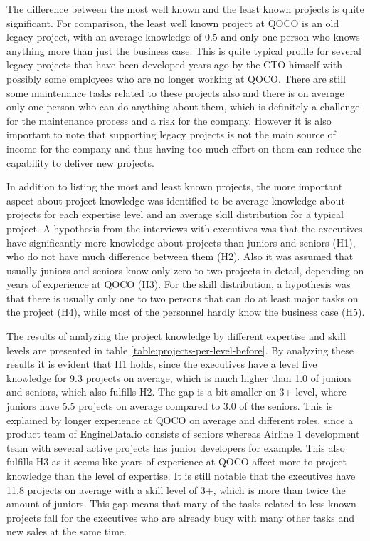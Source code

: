 The difference between the most well known and the least known projects is quite significant. For comparison, the least well known project at QOCO is an old legacy project, with an average
knowledge of 0.5 and only one person who knows anything more than just the business case. This is quite typical profile for several legacy projects that have been developed
years ago by the CTO himself with possibly some employees who are no longer working at QOCO. There are still some maintenance tasks related to these projects also and there is on average
only one person who can do anything about them, which is definitely a challenge for the maintenance process and a risk for the company. However it is also important to note that
supporting legacy projects is not the main source of income for the company and thus having too much effort on them can reduce the capability to deliver new projects.

In addition to listing the most and least known projects, the more important aspect about project knowledge was identified to be average knowledge about projects for each
expertise level and an average skill distribution for a typical project. A hypothesis from the interviews with executives was that the executives have significantly more knowledge
about projects than juniors and seniors (H1), who do not have much difference between them (H2). Also it was assumed that usually juniors and seniors know only zero to two projects in detail,
depending on years of experience at QOCO (H3). For the skill distribution, a hypothesis was that there is usually only one to two persons that can do at least major tasks
on the project (H4), while most of the personnel hardly know the business case (H5).

The results of analyzing the project knowledge by different expertise and skill levels are presented in table \ref{table:projects-per-level-before}.
By analyzing these results it is evident that H1 holds, since the executives have a level five knowledge for 9.3 projects on average, which
is much higher than 1.0 of juniors and seniors, which also fulfills H2. The gap is a bit smaller on 3+ level, where juniors have 5.5 projects on average compared to 3.0 of
the seniors. This is explained by longer experience at QOCO on average and different roles, since a product team of EngineData.io consists of seniors whereas Airline 1
development team with several active projects has junior developers for example. This also fulfills H3 as it seems like years of experience at QOCO affect more to project knowledge
than the level of expertise. It is still notable that the executives have 11.8 projects on average with a skill level of 3+, which is more than twice the amount of juniors.
This gap means that many of the tasks related to less known projects fall for the executives who are already busy with many other tasks and new sales at the same time.


